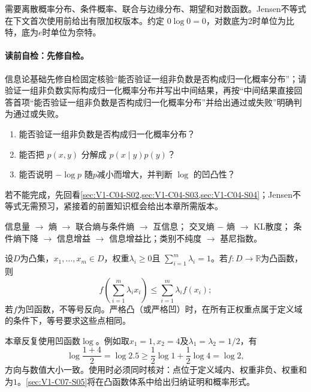 \label{struct:V1-C06-CH02}
\begin{prerequisitebox}
需要离散概率分布、条件概率、联合与边缘分布、期望和对数函数。Jensen不等式在下文首次使用前给出有限加权版本。约定 $0\log0=0$，对数底为2时单位为比特，底为$e$时单位为奈特。
\end{prerequisitebox}

\label{struct:V1-C06-CH03}
\paragraph{读前自检：先修自检。}信息论基础先修自检固定核验“能否验证一组非负数是否构成归一化概率分布”；请验证一组非负数实际构成归一化概率分布并写出中间结果，再按“中间结果直接回答首项“能否验证一组非负数是否构成归一化概率分布”并给出通过或失败”明确判为通过或失败。\par

\begin{precheckbox}
\begin{enumerate}[leftmargin=2.2em]
  \item 能否验证一组非负数是否构成归一化概率分布？
  \item 能否把 $p(x,y)$ 分解成 $p(x\mid y)p(y)$？
  \item 能否说明 $-\log p$ 随$p$减小而增大，并判断 $\log$ 的凹凸性？
\end{enumerate}
若不能完成，先回看\cref{sec:V1-C04-S02,sec:V1-C04-S03,sec:V1-C04-S04}；Jensen不等式无需预习，紧接着的前置知识框会给出本章所需版本。
\end{precheckbox}

\label{struct:V1-C06-CH04}
\begin{dependencybox}
信息量 $\to$ 熵 $\to$ 联合熵与条件熵 $\to$ 互信息；
交叉熵 $-$ 熵 $\to$ KL散度；
条件熵下降 $\to$ 信息增益 $\to$ 信息增益比；类别不纯度 $\to$ 基尼指数。
\end{dependencybox}

\label{pre:V1-C06-finite-jensen}
\begin{keypointbox}[title=前置知识：有限加权Jensen不等式]
设$D$为凸集，$x_1,\ldots,x_m\in D$，权重$\lambda_i\ge0$且
$\sum_{i=1}^m\lambda_i=1$。若$f:D\to\mathbb R$为凸函数，则
\[
f\!\left(\sum_{i=1}^m\lambda_i x_i\right)
\le \sum_{i=1}^m\lambda_i f(x_i);
\]
若$f$为凹函数，不等号反向。严格凸（或严格凹）时，在所有正权重点属于定义域的条件下，等号要求这些点相同。

本章反复使用凹函数$\log$。例如取$x_1=1,x_2=4$及$\lambda_1=\lambda_2=1/2$，有
\[
\log\frac{1+4}{2}=\log 2.5
\ge \frac12\log1+\frac12\log4=\log2,
\]
方向与数值大小一致。使用时必须同时核对：点位于定义域内、权重非负、权重和为$1$。\cref{sec:V1-C07-S05}将在凸函数体系中给出归纳证明和概率形式。
\end{keypointbox}

